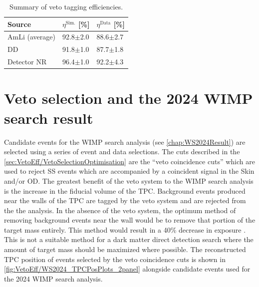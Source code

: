 \begin{table}[!h]
	\centering
	\caption[Summary of veto tagging efficiencies.]{Summary of veto tagging efficiencies.}
	\begin{tabular}{lll}
    \hline\hline
    \textbf{Source}& \textbf{$\eta^\text{Sim.}$ [\%]}& \textbf{$\eta^\text{Data}$ [\%]}\\ 
    \hline
    AmLi (average) & 92.8$\pm$2.0 & 88.6$\pm$2.7\\
    DD & 91.8$\pm$1.0 & 87.7$\pm$1.8\\
    Detector NR & 96.4$\pm$1.0 & 92.2$\pm$4.3\\
    \hline\hline
	\end{tabular}
	\label{tab:VetoEff/final_veto_efficiency}
\end{table}

\section{Veto selection and the 2024 WIMP search result}\label{sec:VetoEff4WIMPSearch}
Candidate events for the WIMP search analysis (see \autoref{chap:WS2024Result}) are selected using a series of event and data selections. The cuts described in the \autoref{sec:VetoEff/VetoSelectionOptimisation} are the ``veto coincidence cuts'' which are used to reject SS events which are accompanied by a coincident signal in the Skin and/or OD. The greatest benefit of the veto system to the WIMP search analysis is the increase in the fiducial volume of the TPC. Background events produced near the walls of the TPC are tagged by the veto system and are rejected from the the analysis. In the absence of the veto system, the optimum method of removing background events near the wall would be to remove that portion of the target mass entirely. This method would result in a 40\% decrease in exposure \cite{lkorley:thesis}. This is not a suitable method for a dark matter direct detection search where the amount of target mass should be maximized where possible. The reconstructed TPC position of events selected by the veto coincidence cuts is shown in \autoref{fig:VetoEff/WS2024_TPCPosPlots_2panel} alongside candidate events used for the 2024 WIMP search analysis.
